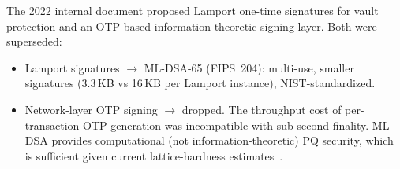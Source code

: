 The 2022 internal document proposed Lamport one-time signatures for
vault protection and an OTP-based information-theoretic signing layer.
Both were superseded:

\begin{itemize}[nosep]
  \item Lamport signatures $\rightarrow$ ML-DSA-65 (FIPS~204): multi-use,
        smaller signatures (3.3\,KB vs 16\,KB per Lamport instance),
        NIST-standardized.
  \item Network-layer OTP signing $\rightarrow$ dropped. The throughput
        cost of per-transaction OTP generation was incompatible with
        sub-second finality. ML-DSA provides computational (not
        information-theoretic) PQ security, which is sufficient given
        current lattice-hardness estimates~\cite{nist-pqc-report}.
\end{itemize}

